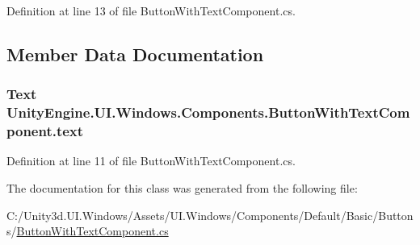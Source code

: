 Definition at line 13 of file Button\+With\+Text\+Component.\+cs.



\subsection{Member Data Documentation}
\hypertarget{class_unity_engine_1_1_u_i_1_1_windows_1_1_components_1_1_button_with_text_component_ae4f933bea7cb72f631e58a991e74f845}{}
\subsubsection[{text}]{\setlength{\rightskip}{0pt plus 5cm}Text Unity\+Engine.\+U\+I.\+Windows.\+Components.\+Button\+With\+Text\+Component.\+text}\label{class_unity_engine_1_1_u_i_1_1_windows_1_1_components_1_1_button_with_text_component_ae4f933bea7cb72f631e58a991e74f845}


Definition at line 11 of file Button\+With\+Text\+Component.\+cs.



The documentation for this class was generated from the following file\+:\begin{DoxyCompactItemize}
\item 
C\+:/\+Unity3d.\+U\+I.\+Windows/\+Assets/\+U\+I.\+Windows/\+Components/\+Default/\+Basic/\+Buttons/\hyperlink{_button_with_text_component_8cs}{Button\+With\+Text\+Component.\+cs}\end{DoxyCompactItemize}
